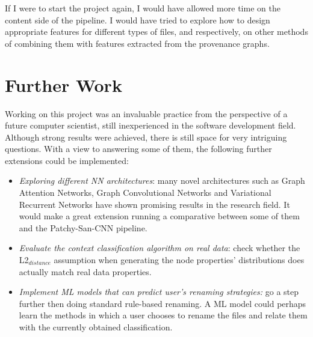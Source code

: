     If I were to start the project again, I would have allowed more time on the content side of the pipeline. I would have tried to explore how to design appropriate features for different types of files, and respectively, on other methods of combining them with features extracted from the provenance graphs. \\ 
    
    \section{Further Work}
    
    Working on this project was an invaluable practice from the perspective of a future computer scientist, still inexperienced in the software development field. Although strong results were achieved, there is still space for very intriguing questions. With a view to answering some of them, the following further extensions could be implemented:
    
    \begin{itemize}
        \item \textit{Exploring different NN architectures}: many novel architectures such as Graph Attention Networks, Graph Convolutional Networks and Variational Recurrent Networks have shown promising results in the research field. It would make a great extension running a comparative between some of them and the Patchy-San-CNN pipeline.
        
        \item \textit{Evaluate the context classification algorithm on real data}: check whether the L2$_{distance}$ assumption when generating the node properties' distributions does actually match real data properties. 
        
        \item \textit{Implement ML models that can predict user's renaming strategies:} go a step further then doing standard rule-based renaming. A ML model could perhaps learn the methods in which a user chooses to rename the files and relate them with the currently obtained classification.    
    
    \end{itemize}
    
